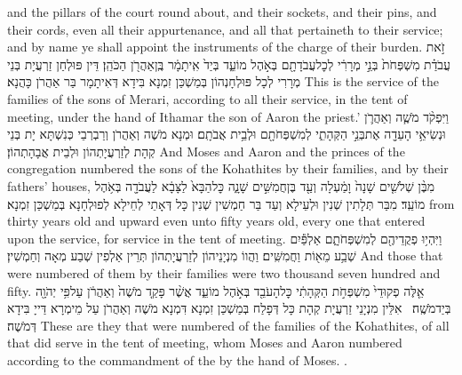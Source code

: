 {and the pillars of the court round about, and their sockets, and their pins, and their cords, even all their appurtenance, and all that pertaineth to their service; and by name ye shall appoint the instruments of the charge of their burden.}{}
{זֹ֣את עֲבֹדַ֗ת מִשְׁפְּחֹת֙ בְּנֵ֣י מְרָרִ֔י לְכׇל\maqqaf עֲבֹדָתָ֖ם בְּאֹ֣הֶל מוֹעֵ֑ד בְּיַד֙ אִֽיתָמָ֔ר בֶּֽן\maqqaf אַהֲרֹ֖ן הַכֹּהֵֽן׃}
{דֵּין פּוּלְחַן זַרְעֲיָת בְּנֵי מְרָרִי לְכָל פּוּלְחָנְהוֹן בְּמַשְׁכַּן זִמְנָא בִּידָא דְּאִיתָמָר בַּר אַהֲרֹן כָּהֲנָא׃}
{This is the service of the families of the sons of Merari, according to all their service, in the tent of meeting, under the hand of Ithamar the son of Aaron the priest.’}{}
{וַיִּפְקֹ֨ד מֹשֶׁ֧ה וְאַהֲרֹ֛ן וּנְשִׂיאֵ֥י הָעֵדָ֖ה אֶת\maqqaf בְּנֵ֣י הַקְּהָתִ֑י לְמִשְׁפְּחֹתָ֖ם וּלְבֵ֥ית אֲבֹתָֽם׃}
{וּמְנָא מֹשֶׁה וְאַהֲרֹן וְרַבְרְבֵי כְּנִשְׁתָּא יָת בְּנֵי קְהָת לְזַרְעֲיָתְהוֹן וּלְבֵית אֲבָהָתְהוֹן׃}
{And Moses and Aaron and the princes of the congregation numbered the sons of the Kohathites by their families, and by their fathers’ houses,}{}
{מִבֶּ֨ן שְׁלֹשִׁ֤ים שָׁנָה֙ וָמַ֔עְלָה וְעַ֖ד בֶּן\maqqaf חֲמִשִּׁ֣ים שָׁנָ֑ה כׇּל\maqqaf הַבָּא֙ לַצָּבָ֔א לַעֲבֹדָ֖ה בְּאֹ֥הֶל מוֹעֵֽד׃}
{מִבַּר תְּלָתִין שְׁנִין וּלְעֵילָא וְעַד בַּר חַמְשִׁין שְׁנִין כָּל דְּאָתֵי לְחֵילָא לְפוּלְחָנָא בְּמַשְׁכַּן זִמְנָא׃}
{from thirty years old and upward even unto fifty years old, every one that entered upon the service, for service in the tent of meeting.}{}
{וַיִּהְי֥וּ פְקֻדֵיהֶ֖ם לְמִשְׁפְּחֹתָ֑ם אַלְפַּ֕יִם שְׁבַ֥ע מֵא֖וֹת וַחֲמִשִּֽׁים׃}
{וַהֲווֹ מִנְיָנֵיהוֹן לְזַרְעֲיָתְהוֹן תְּרֵין אַלְפִין שְׁבַע מְאָה וְחַמְשִׁין׃}
{And those that were numbered of them by their families were two thousand seven hundred and fifty.}{}
{אֵ֤לֶּה פְקוּדֵי֙ מִשְׁפְּחֹ֣ת הַקְּהָתִ֔י כׇּל\maqqaf הָעֹבֵ֖ד בְּאֹ֣הֶל מוֹעֵ֑ד אֲשֶׁ֨ר פָּקַ֤ד מֹשֶׁה֙ וְאַהֲרֹ֔ן עַל\maqqaf פִּ֥י יְהֹוָ֖ה בְּיַד\maqqaf מֹשֶֽׁה׃ \setuma }
{אִלֵּין מִנְיָנֵי זַרְעֲיָת קְהָת כָּל דְּפָלַח בְּמַשְׁכַּן זִמְנָא דִּמְנָא מֹשֶׁה וְאַהֲרֹן עַל מֵימְרָא דַּייָ בִּידָא דְּמֹשֶׁה׃}
{These are they that were numbered of the families of the Kohathites, of all that did serve in the tent of meeting, whom Moses and Aaron numbered according to the commandment of the \lord\space by the hand of Moses. .}{}
